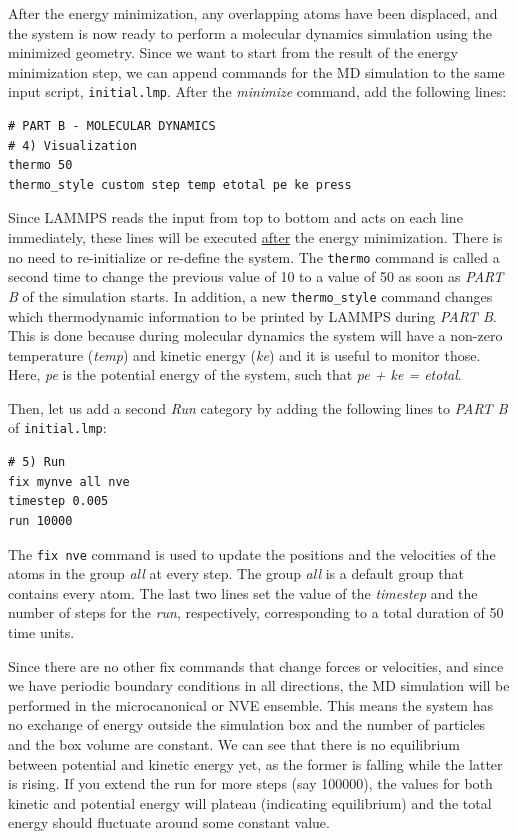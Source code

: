 \documentclass[9pt,tutorial]{livecoms}
\renewcommand{\emph}[1]{\underline{#1}} %
\newcommand{\lmpcmd}[1]{\hspace{0pt}\colorbox{listing}{\textcolor{command}{\texttt{#1}}}\hspace{0pt}} %
\newcommand{\flecmd}[1]{\textcolor{command}{\texttt{#1}}} %
\begin{document}
After the energy minimization, any overlapping atoms have been
displaced, and the system is now ready to perform a molecular dynamics
simulation using the minimized geometry.  Since we want to start from
the result of the energy minimization step, we can append commands for
the MD simulation to the same input script, \flecmd{initial.lmp}. After
the \textit{minimize} command, add the following lines:
\begin{lstlisting}
# PART B - MOLECULAR DYNAMICS
# 4) Visualization
thermo 50
thermo_style custom step temp etotal pe ke press
\end{lstlisting}

Since LAMMPS reads the input from top to bottom and acts on each line
immediately, these lines will be executed \emph{after} the energy
minimization.  There is no need to re-initialize or re-define the
system.  The \lmpcmd{thermo} command is called a second time to change
the previous value of 10 to a value of 50 as soon as \textit{PART B} of
the simulation starts.  In addition, a new \lmpcmd{thermo\_style}
command changes which thermodynamic information to be printed by LAMMPS
during \textit{PART B}.  This is done because during molecular
dynamics the system will have a non-zero temperature (\textit{temp})
and kinetic energy (\textit{ke}) and it is useful to monitor those.
Here, \textit{pe} is the potential energy of the system, such that
\textit{pe + ke = etotal}.

Then, let us add a second \textit{Run} category by adding the following
lines to \textit{PART B} of \flecmd{initial.lmp}:
\begin{lstlisting}
# 5) Run
fix mynve all nve
timestep 0.005
run 10000
\end{lstlisting}
The \lmpcmd{fix nve} command is used to update the positions and the
velocities of the atoms in the group \textit{all} at every step.  The
group \textit{all} is a default group that contains every atom.  The
last two lines set the value of the \textit{timestep} and the number of
steps for the \textit{run}, respectively, corresponding to a total
duration of 50 time units.

Since there are no other fix commands that change forces or velocities,
and since we have periodic boundary conditions in all directions, the MD
simulation will be performed in the microcanonical or NVE ensemble.
This means the system has no exchange of energy outside the simulation
box and the number of particles and the box volume are constant.  We can
see that there is no equilibrium between potential and kinetic energy
yet, as the former is falling while the latter is rising.  If you extend
the run for more steps (say 100000), the values for both kinetic and
potential energy will plateau (indicating equilibrium) and the total
energy should fluctuate around some constant value.
\end{document}
